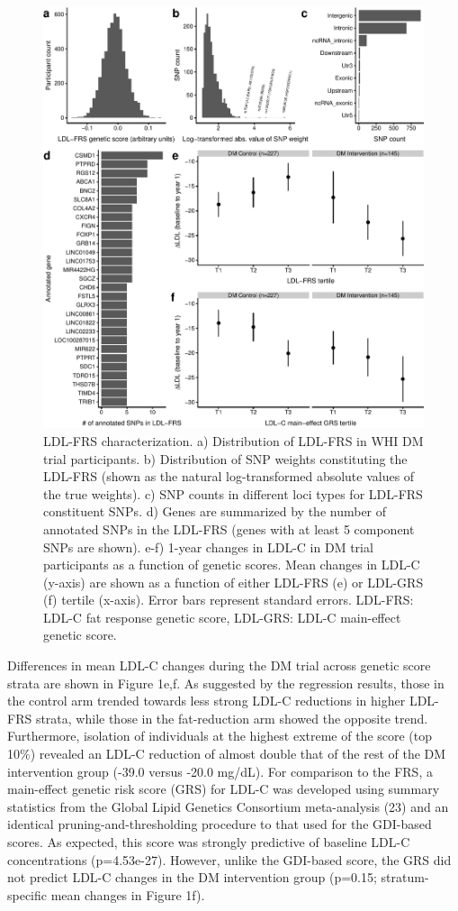 \documentclass[]{article}
\begin{document}
\begin{figure}
\centering
\includegraphics{figures/ldl-score-characterization-1.pdf}
\caption{LDL-FRS characterization. a) Distribution of LDL-FRS in WHI DM
trial participants. b) Distribution of SNP weights constituting the
LDL-FRS (shown as the natural log-transformed absolute values of the
true weights). c) SNP counts in different loci types for LDL-FRS
constituent SNPs. d) Genes are summarized by the number of annotated
SNPs in the LDL-FRS (genes with at least 5 component SNPs are shown).
e-f) 1-year changes in LDL-C in DM trial participants as a function of
genetic scores. Mean changes in LDL-C (y-axis) are shown as a function
of either LDL-FRS (e) or LDL-GRS (f) tertile (x-axis). Error bars
represent standard errors. LDL-FRS: LDL-C fat response genetic score,
LDL-GRS: LDL-C main-effect genetic score.}
\end{figure}

Differences in mean LDL-C changes during the DM trial across genetic
score strata are shown in Figure 1e,f. As suggested by the regression
results, those in the control arm trended towards less strong LDL-C
reductions in higher LDL-FRS strata, while those in the fat-reduction
arm showed the opposite trend. Furthermore, isolation of individuals at
the highest extreme of the score (top 10\%) revealed an LDL-C reduction
of almost double that of the rest of the DM intervention group (-39.0
versus -20.0 mg/dL). For comparison to the FRS, a main-effect genetic
risk score (GRS) for LDL-C was developed using summary statistics from
the Global Lipid Genetics Consortium meta-analysis (23) and an identical
pruning-and-thresholding procedure to that used for the GDI-based
scores. As expected, this score was strongly predictive of baseline
LDL-C concentrations (p=4.53e-27). However, unlike the GDI-based score,
the GRS did not predict LDL-C changes in the DM intervention group
(p=0.15; stratum-specific mean changes in Figure 1f).
\end{document}

